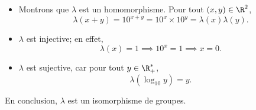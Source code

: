 \begin{itemize}
  \item
    Montrons que $\lambda$ est un homomorphisme. Pour tout $(x,y)\in\R^2$,
    \[
      \lambda(x+y) = 10^{x+y} = 10^x\times 10^y = \lambda(x) \lambda(y).
    \]

  \item
    $\lambda$ est injective; en effet,
    \[
      \lambda(x) = 1 \implies 10^x = 1 \implies x = 0.
    \]

  \item
    $\lambda$ est sujective, car pour tout $y\in\R_+^*$,
    \[
      \lambda(\log_{10}y) = y.
    \]
\end{itemize}

En conclusion, $\lambda$ est un isomorphisme de groupes.
